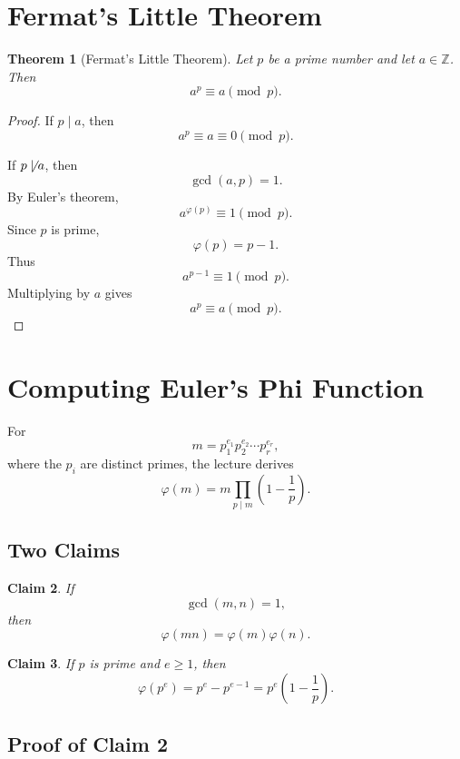 \documentclass[11pt]{article}
\newtheorem{theorem}{Theorem}[section]
\newtheorem{claim}[theorem]{Claim}
\theoremstyle{remark}
\DeclareMathOperator{\gcdop}{gcd}
\newcommand{\Z}{\mathbb Z}
\newcommand{\phiE}{\varphi}
\begin{document}
\section{Fermat's Little Theorem}

\begin{theorem}[Fermat's Little Theorem]
Let $p$ be a prime number and let $a\in\Z$. Then
\[
    a^p\equiv a\pmod p.
\]
\end{theorem}

\begin{proof}
If $p\mid a$, then
\[
    a^p\equiv a\equiv0\pmod p.
\]

If $p\not\mid a$, then
\[
    \gcdop(a,p)=1.
\]
By Euler's theorem,
\[
    a^{\phiE(p)}\equiv1\pmod p.
\]
Since $p$ is prime,
\[
    \phiE(p)=p-1.
\]
Thus
\[
    a^{p-1}\equiv1\pmod p.
\]
Multiplying by $a$ gives
\[
    a^p\equiv a\pmod p.
\]
\end{proof}

\section{Computing Euler's Phi Function}

For
\[
    m=p_1^{e_1}p_2^{e_2}\cdots p_r^{e_r},
\]
where the $p_i$ are distinct primes, the lecture derives
\[
    \boxed{
    \phiE(m)
    =
    m\prod_{p\mid m}\left(1-\frac1p\right)
    }.
\]

\subsection{Two Claims}

\begin{claim}
If
\[
    \gcdop(m,n)=1,
\]
then
\[
    \phiE(mn)=\phiE(m)\phiE(n).
\]
\end{claim}

\begin{claim}
If $p$ is prime and $e\ge1$, then
\[
    \phiE(p^e)=p^e-p^{e-1}
    =
    p^e\left(1-\frac1p\right).
\]
\end{claim}

\subsection{Proof of Claim 2}
\end{document}
